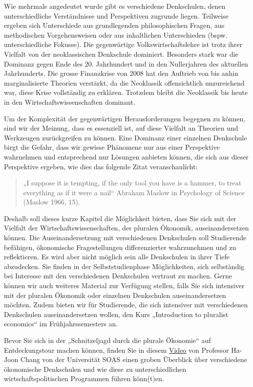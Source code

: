\documentclass[
  nswissgerman,
  a4paper,
  DIV=11,
  numbers=noendperiod,
  oneside,
  openany]{scrreprt}
\begin{document}
Wie mehrmals angedeutet wurde gibt es verschiedene Denkschulen, denen
unterschiedliche Verständnisse und Perspektiven zugrunde liegen.
Teilweise ergeben sich Unterschiede aus grundlegenden philosophischen
Fragen, aus methodischen Vorgehensweisen oder aus inhaltlichen
Unterschieden (bspw. unterschiedliche Fokusse). Die gegenwärtige
Volkswirtschaftslehre ist trotz ihrer Vielfalt von der neoklassischen
Denkschule dominiert. Besonders stark war die Dominanz gegen Ende des
20. Jahrhundert und in den Nullerjahren des aktuellen Jahrhunderts. Die
grosse Finanzkrise von 2008 hat den Auftrieb von bis anhin
marginalisierte Theorien verstärkt, da die Neoklassik offensichtlich
unzureichend war, diese Krise vollständig zu erklären. Trotzdem bleibt
die Neoklassik bis heute in den Wirtschaftswissenschaften dominant.

Um der Komplexität der gegenwärtigen Herausforderungen begegnen zu
können, sind wir der Meinung, dass es essenziell ist, auf diese Vielfalt
an Theorien und Werkzeugen zurückgreifen zu können. Eine Dominanz einer
einzelnen Denkschule birgt die Gefahr, dass wir gewisse Phänomene nur
aus einer Perspektive wahrnehmen und entsprechend nur Lösungen anbieten
können, die sich aus dieser Perspektive ergeben, wie dies das folgende
Zitat veranschaulicht:

\begin{quote}
„I suppose it is tempting, if the only tool you have is a hammer, to
treat everything as if it were a nail`` Abraham Maslow in Psychology of
Science (Maslow 1966, 15).
\end{quote}

Deshalb soll dieses kurze Kapitel die Möglichkeit bieten, dass Sie sich
mit der Vielfalt der Wirtschaftswissenschaften, der pluralen Ökonomik,
auseinandersetzen können. Die Auseinandersetzung mit verschiedenen
Denkschulen soll Studierende befähigen, ökonomische Fragestellungen
differenzierter wahrzunehmen und zu reflektieren. Es wird aber nicht
möglich sein alle Denkschulen in ihrer Tiefe abzudecken. Sie finden in
der Selbststudienphase Möglichkeiten, sich selbständig bei Interesse mit
den verschiedenen Denkschulen vertraut zu machen. Gerne können wir auch
weiteres Material zur Verfügung stellen, falls Sie sich intensiver mit
der pluralen Ökonomik oder einzelnen Denkschulen auseinandersetzen
möchten. Zudem bieten wir für Studierende, die sich intensiver mit
verschiedenen Denkschulen auseinandersetzen wollen, den Kurs
„Introduction to pluralist economics`` im Frühjahrssemesters an.

Bevor Sie sich in der „Schnitzeljagd durch die plurale Ökonomie`` auf
Entdeckungstour machen können, finden Sie in diesem
\href{https://www.youtube.com/watch?v=NdbbcO35arw}{Video} von Professor
Ha-Joon Chang von der Universität SOAS einen groben Überblick über
verschiedene ökonomische Denkschulen und wie diese zu unterschiedlichen
wirtschaftspolitischen Programmen führen könn(t)en.
\end{document}
